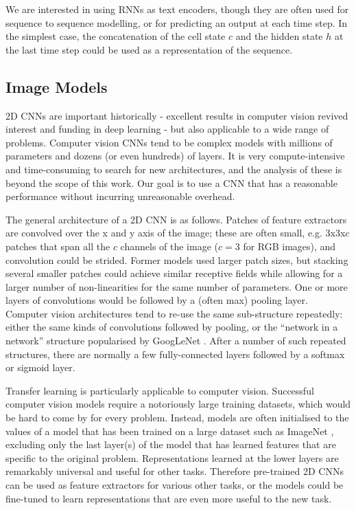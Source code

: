 We are interested in using RNNs as text encoders, though they are often used for sequence to sequence modelling, or for predicting an output at each time step.
In the simplest case, the concatenation of the cell state $c$ and the hidden state $h$ at the last time step could be used as a representation of the sequence.

\subsection{Image Models}
\label{image_models}

2D CNNs are important historically - excellent results in computer vision revived interest and funding in deep learning - but also applicable to a wide range of problems.
Computer vision CNNs tend to be complex models with millions of parameters and dozens (or even hundreds) of layers.
It is very compute-intensive and time-consuming to search for new architectures, and the analysis of these is beyond the scope of this work.
Our goal is to use a CNN that has a reasonable performance without incurring unreasonable overhead.

The general architecture of a 2D CNN is as follows.
Patches of feature extractors are convolved over the x and y axis of the image; these are often small, e.g. 3x3x$c$ patches that span all the $c$ channels of the image ($c=3$ for RGB images), and convolution could be strided.
Former models used larger patch sizes, but stacking several smaller patches could achieve similar receptive fields while allowing for a larger number of non-linearities for the same number of parameters.
One or more layers of convolutions would be followed by a (often max) pooling layer.
Computer vision architectures tend to re-use the same sub-structure repeatedly: either the same kinds of convolutions followed by pooling, or the ``network in a network'' structure popularised by GoogLeNet \cite{googlenet}.
After a number of such repeated structures, there are normally a few fully-connected layers followed by a softmax or sigmoid layer.

Transfer learning is particularly applicable to computer vision.
Successful computer vision models require a notoriously large training datasets, which would be hard to come by for every problem.
Instead, models are often initialised to the values of a model that has been trained on a large dataset such as ImageNet \cite{imagenet}, excluding only the last layer(s) of the model that has learned features that are specific to the original problem.
Representations learned at the lower layers are remarkably  universal and useful for other tasks.
Therefore pre-trained 2D CNNs can be used as feature extractors for various other tasks,  or the models could be fine-tuned to learn representations that are even more useful to the new task.

